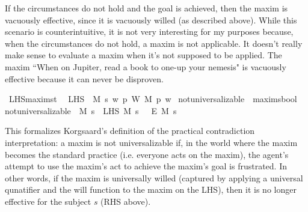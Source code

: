 \begin{isabellebody}
\begin{isamarkuptext}
If the circumstances do not hold and the goal is achieved, then the maxim is vacuously effective, since 
it is vacuously willed (as described above). While this scenario is counterintuitive, it is not very 
interesting for my purposes because, when the circumstances do not hold, a maxim is not applicable. It 
doesn't really make sense to evaluate a maxim when it's not supposed to be applied. The maxim ``When on Jupiter,
read a book to one-up your nemesis" is vacuously effective because it can never be disproven.%
\end{isamarkuptext}\isamarkuptrue%
\isamarkupfalse%
\ LHS{\isacharcolon}{\isacharcolon}{\isachardoublequoteopen}maxim{\isasymRightarrow}s{\isasymRightarrow}t{\isachardoublequoteclose}\ \ \isanewline
{\isachardoublequoteopen}LHS\ {\isasymequiv}\ {\isasymlambda}M\ s{\isachardot}\ {\isacharparenleft}{\isasymlambda}w{\isachardot}\ {\isacharparenleft}{\isasymforall}p{\isachardot}\ W\ M\ p\ w{\isacharparenright}{\isacharparenright}{\isachardoublequoteclose}\isanewline
\isanewline
{}\isamarkupfalse%
\ not{\isacharunderscore}universalizable\ {\isacharcolon}{\isacharcolon}\ {\isachardoublequoteopen}maxim{\isasymRightarrow}s{\isasymRightarrow}bool{\isachardoublequoteclose}\ \ \isanewline
{\isachardoublequoteopen}not{\isacharunderscore}universalizable\ {\isasymequiv}\ {\isasymlambda}M\ s{\isachardot}\ {\isacharparenleft}{\isasymTurnstile}\ {\isacharparenleft}LHS\ M\ s\ \isactrlbold {\isasymrightarrow}\ {\isacharparenleft}\isactrlbold {\isasymnot}\ {\isacharparenleft}E\ M\ s{\isacharparenright}{\isacharparenright}{\isacharparenright}{\isacharparenright}{\isachardoublequoteclose}\isanewline
%
\isanewline
{}\isamarkupfalse%
%
\begin{isamarkuptext}%
This formalizes Korgsaard's definition of the practical contradiction
interpretation:  a maxim is not universalizable 
if, in the world where the maxim becomes the standard practice (i.e. everyone acts on the maxim), the
agent's attempt to use the maxim's act to achieve the maxim's goal is frustrated. In other words, if 
the maxim is universally willed (captured by applying a universal qunatifier and the will function 
to the maxim on the LHS), then it is no longer effective for the subject $s$ (RHS above). 


\end{isamarkuptext}
\end{isabellebody}
